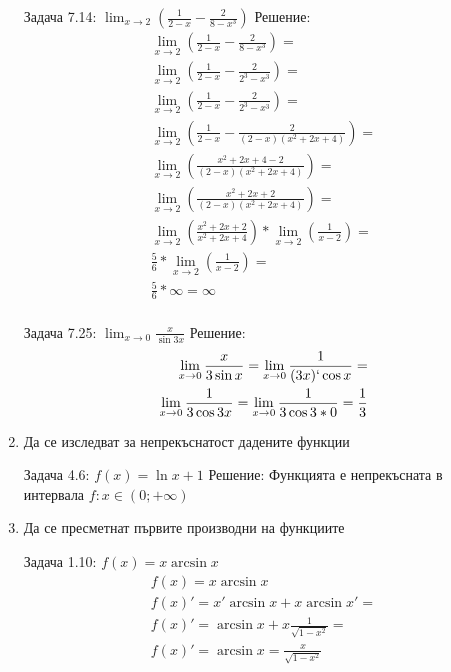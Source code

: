 \documentclass[a4paper, 20pt, fleqn, border=2pt]{article}
\begin{document}
\begin{enumerate}
Задача 7.14: $\lim_{x\to2}(\frac{1}{2 - x} - \frac{2}{8 - x^3})$
Решение:
\begin{equation}
\begin{split}
    \lim_{x\to2}(\frac{1}{2 - x} - \frac{2}{8 - x^3}) = \\
    \lim_{x\to2}(\frac{1}{2 - x} - \frac{2}{2^3 - x^3}) = \\
    \lim_{x\to2}(\frac{1}{2 - x} - \frac{2}{2^3 - x^3}) = \\
    \lim_{x\to2}(\frac{1}{2 - x} - \frac{2}{(2 - x)(x^2 + 2x + 4)}) = \\
    \lim_{x\to2}(\frac{x^2 + 2x + 4 - 2}{(2 - x)(x^2 + 2x + 4)}) = \\
    \lim_{x\to2}(\frac{x^2 + 2x + 2}{(2 - x)(x^2 + 2x + 4)}) = \\
    \lim_{x\to2}(\frac{x^2 + 2x + 2}{x^2 + 2x + 4}) * \lim_{x\to2}(\frac{1}{x - 2}) = \\
    \frac{5}{6} * \lim_{x\to2}(\frac{1}{x - 2}) = \\
    \frac{5}{6} * \infty = \infty \\
\end{split}
\end{equation}

Задача 7.25: $\lim_{x\to0}\frac{x}{\sin{3x}}$
Решение:
\begin{equation}
\begin{split}
    \lim_{x\to0}\frac{x}{3\sin{x}} = \lim_{x\to0}\frac{1}{(3x)`\cos{x}} = \\
    \lim_{x\to0}\frac{1}{3\cos{3x}} = \lim_{x\to0}\frac{1}{3\cos{3 * 0}} = \frac{1}{3}
\end{split}
\end{equation}

    \item Да се изследват за непрекъснатост дадените функции
\par
\par

Задача 4.6: $f(x) = \ln{x + 1}$
Решение:
Функцията е непрекъсната в интервала $f : x \in (0; +\infty)$

    \item Да се пресметнат първите производни на функциите
\par
\par

Задача 1.10: $f(x) = x\arcsin{x}$
\begin{equation}
\begin{split}
    f(x) = x\arcsin{x} \\
    f(x)' = x'\arcsin{x} + x\arcsin{x}' = \\
    f(x)' = \arcsin{x} + x\frac{1}{\sqrt{1-x^2}} = \\
    f(x)' = \arcsin{x} = \frac{x}{\sqrt{1-x^2}}
\end{split}
\end{equation}


\end{enumerate}
\end{document}
